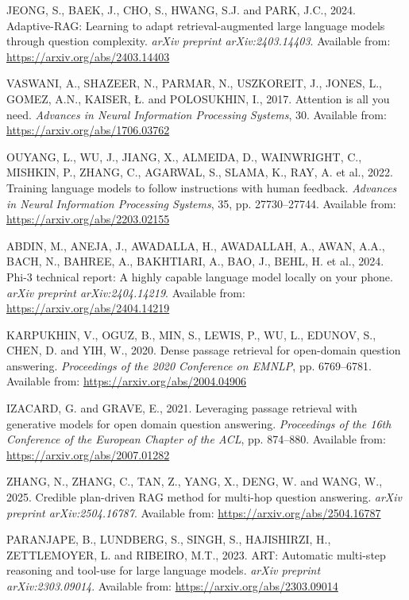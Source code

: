 \documentclass[12pt,a4paper]{article}
\begin{document}
JEONG, S., BAEK, J., CHO, S., HWANG, S.J. and PARK, J.C., 2024. Adaptive-RAG: Learning to adapt retrieval-augmented large language models through question complexity. \textit{arXiv preprint arXiv:2403.14403}. Available from: \url{https://arxiv.org/abs/2403.14403}


VASWANI, A., SHAZEER, N., PARMAR, N., USZKOREIT, J., JONES, L., GOMEZ, A.N., KAISER, Ł. and POLOSUKHIN, I., 2017. Attention is all you need. \textit{Advances in Neural Information Processing Systems}, 30. Available from: \url{https://arxiv.org/abs/1706.03762}

OUYANG, L., WU, J., JIANG, X., ALMEIDA, D., WAINWRIGHT, C., MISHKIN, P., ZHANG, C., AGARWAL, S., SLAMA, K., RAY, A. et al., 2022. Training language models to follow instructions with human feedback. \textit{Advances in Neural Information Processing Systems}, 35, pp. 27730--27744. Available from: \url{https://arxiv.org/abs/2203.02155}

ABDIN, M., ANEJA, J., AWADALLA, H., AWADALLAH, A., AWAN, A.A., BACH, N., BAHREE, A., BAKHTIARI, A., BAO, J., BEHL, H. et al., 2024. Phi-3 technical report: A highly capable language model locally on your phone. \textit{arXiv preprint arXiv:2404.14219}. Available from: \url{https://arxiv.org/abs/2404.14219}

KARPUKHIN, V., OGUZ, B., MIN, S., LEWIS, P., WU, L., EDUNOV, S., CHEN, D. and YIH, W., 2020. Dense passage retrieval for open-domain question answering. \textit{Proceedings of the 2020 Conference on EMNLP}, pp. 6769--6781. Available from: \url{https://arxiv.org/abs/2004.04906}

IZACARD, G. and GRAVE, E., 2021. Leveraging passage retrieval with generative models for open domain question answering. \textit{Proceedings of the 16th Conference of the European Chapter of the ACL}, pp. 874--880. Available from: \url{https://arxiv.org/abs/2007.01282}

ZHANG, N., ZHANG, C., TAN, Z., YANG, X., DENG, W. and WANG, W., 2025. Credible plan-driven RAG method for multi-hop question answering. \textit{arXiv preprint arXiv:2504.16787}. Available from: \url{https://arxiv.org/abs/2504.16787}

PARANJAPE, B., LUNDBERG, S., SINGH, S., HAJISHIRZI, H., ZETTLEMOYER, L. and RIBEIRO, M.T., 2023. ART: Automatic multi-step reasoning and tool-use for large language models. \textit{arXiv preprint arXiv:2303.09014}. Available from: \url{https://arxiv.org/abs/2303.09014}
\end{document}

